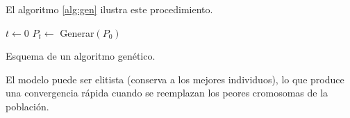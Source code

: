 El algoritmo \ref{alg:gen} ilustra este procedimiento.

\begin{Ualgorithm}[H]
    \label{alg:gen}
    \small
    \DontPrintSemicolon
    $t \longleftarrow 0$\;
    $P_t \longleftarrow$ Generar$(P_0)$ 

    \caption{Esquema de un algoritmo genético.}
\end{Ualgorithm}

El modelo puede ser elitista (conserva a los mejores individuos), lo que produce una convergencia rápida cuando se reemplazan los peores cromosomas de la población.